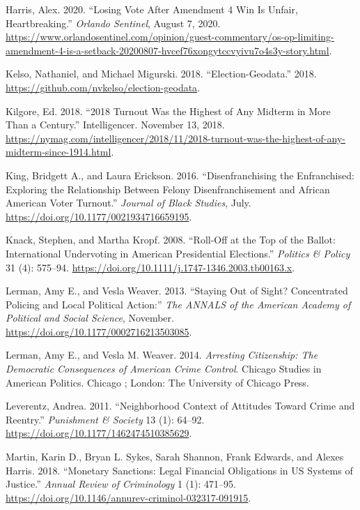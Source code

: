 \documentclass[
  12pt,
]{article}
\newlength{\cslhangindent}
\newenvironment{cslreferences}%
  {\setlength{\parindent}{0pt}%
  \everypar{\setlength{\hangindent}{\cslhangindent}}\ignorespaces}%
  {\par}
\begin{document}
\begin{cslreferences}
\leavevmode\hypertarget{ref-Harris2020}{}%
Harris, Alex. 2020. ``Losing Vote After Amendment 4 Win Is Unfair, Heartbreaking.'' \emph{Orlando Sentinel}, August 7, 2020. \url{https://www.orlandosentinel.com/opinion/guest-commentary/os-op-limiting-amendment-4-is-a-setback-20200807-hvcef76xongytccvyivu7o4s3y-story.html}.

\leavevmode\hypertarget{ref-Kelso2018}{}%
Kelso, Nathaniel, and Michael Migurski. 2018. ``Election-Geodata.'' 2018. \url{https://github.com/nvkelso/election-geodata}.

\leavevmode\hypertarget{ref-Kilgore2018}{}%
Kilgore, Ed. 2018. ``2018 Turnout Was the Highest of Any Midterm in More Than a Century.'' Intelligencer. November 13, 2018. \url{https://nymag.com/intelligencer/2018/11/2018-turnout-was-the-highest-of-any-midterm-since-1914.html}.

\leavevmode\hypertarget{ref-King2016}{}%
King, Bridgett A., and Laura Erickson. 2016. ``Disenfranchising the Enfranchised: Exploring the Relationship Between Felony Disenfranchisement and African American Voter Turnout.'' \emph{Journal of Black Studies}, July. \url{https://doi.org/10.1177/0021934716659195}.

\leavevmode\hypertarget{ref-Knack2008}{}%
Knack, Stephen, and Martha Kropf. 2008. ``Roll-Off at the Top of the Ballot: International Undervoting in American Presidential Elections.'' \emph{Politics \& Policy} 31 (4): 575--94. \url{https://doi.org/10.1111/j.1747-1346.2003.tb00163.x}.

\leavevmode\hypertarget{ref-Lerman2013}{}%
Lerman, Amy E., and Vesla Weaver. 2013. ``Staying Out of Sight? Concentrated Policing and Local Political Action:'' \emph{The ANNALS of the American Academy of Political and Social Science}, November. \url{https://doi.org/10.1177/0002716213503085}.

\leavevmode\hypertarget{ref-Lerman2014}{}%
Lerman, Amy E., and Vesla M. Weaver. 2014. \emph{Arresting Citizenship: The Democratic Consequences of American Crime Control}. Chicago Studies in American Politics. Chicago ; London: The University of Chicago Press.

\leavevmode\hypertarget{ref-Leverentz2011}{}%
Leverentz, Andrea. 2011. ``Neighborhood Context of Attitudes Toward Crime and Reentry.'' \emph{Punishment \& Society} 13 (1): 64--92. \url{https://doi.org/10.1177/1462474510385629}.

\leavevmode\hypertarget{ref-Martin2018}{}%
Martin, Karin D., Bryan L. Sykes, Sarah Shannon, Frank Edwards, and Alexes Harris. 2018. ``Monetary Sanctions: Legal Financial Obligations in US Systems of Justice.'' \emph{Annual Review of Criminology} 1 (1): 471--95. \url{https://doi.org/10.1146/annurev-criminol-032317-091915}.


\end{cslreferences}
\end{document}
